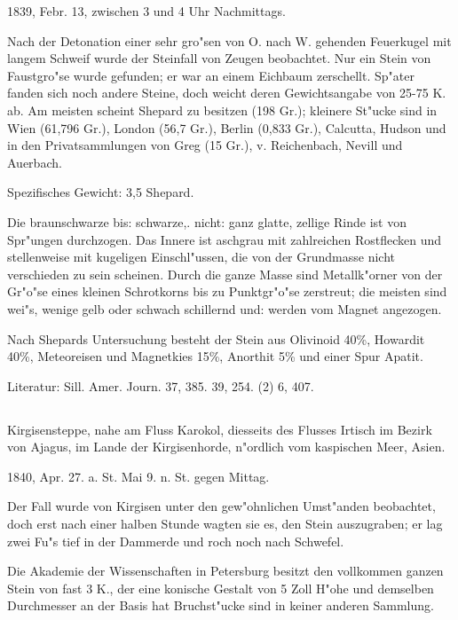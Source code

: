 \documentclass[a4paper, 11pt, oneside]{article}
\begin{document}
1839, Febr. 13, zwischen 3 und 4 Uhr Nachmittags.

Nach der Detonation einer sehr gro"sen von O. nach W. gehenden Feuerkugel mit langem Schweif wurde der Steinfall von Zeugen beobachtet. Nur ein Stein von Faustgro"se wurde gefunden; er war an einem Eichbaum zerschellt. Sp"ater fanden sich noch andere Steine, doch weicht deren Gewichtsangabe von 25-75 K. ab. Am meisten scheint Shepard zu besitzen (198 Gr.); kleinere St"ucke sind in Wien (61,796 Gr.), London (56,7 Gr.), Berlin (0,833 Gr.), Calcutta, Hudson und in den Privatsammlungen von Greg (15 Gr.), v. Reichenbach, Nevill und Auerbach.

Spezifisches Gewicht: 3,5 Shepard.

Die braunschwarze bis: schwarze,. nicht: ganz glatte, zellige Rinde ist von Spr"ungen durchzogen. Das Innere ist aschgrau mit zahlreichen Rostflecken und stellenweise mit kugeligen Einschl"ussen, die von der Grundmasse nicht verschieden zu sein scheinen. Durch die ganze Masse sind Metallk"orner von der Gr"o"se eines kleinen Schrotkorns bis zu Punktgr"o"se zerstreut; die meisten sind wei"s, wenige gelb oder schwach schillernd und: werden vom Magnet angezogen.

Nach Shepards Untersuchung besteht der Stein aus Olivinoid 40\%, Howardit 40\%, Meteoreisen und Magnetkies 15\%, Anorthit 5\% und einer Spur Apatit.

\normalsize
Literatur: Sill. Amer. Journ. 37, 385. 39, 254. (2) 6, 407.

\subsection{}
\LARGE
\paragraph{}
Kirgisensteppe, nahe am Fluss Karokol, diesseits des Flusses Irtisch im Bezirk von Ajagus, im Lande der Kirgisenhorde, n"ordlich vom kaspischen Meer, Asien.

1840, Apr. 27. a. St. Mai 9. n. St. gegen Mittag.

Der Fall wurde von Kirgisen unter den gew"ohnlichen Umst"anden beobachtet, doch erst nach einer halben Stunde wagten sie es, den Stein auszugraben; er lag zwei Fu"s tief in der Dammerde und roch noch nach Schwefel.

Die Akademie der Wissenschaften in Petersburg besitzt den vollkommen ganzen Stein von fast 3 K., der eine konische Gestalt von 5 Zoll H"ohe und demselben Durchmesser an der Basis hat Bruchst"ucke sind in keiner anderen Sammlung.
\end{document}
